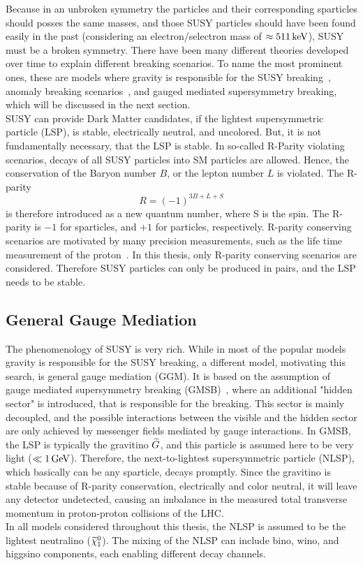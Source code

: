 Because in an unbroken symmetry the particles and their corresponding sparticles should posses the same masses, and those SUSY particles should have been found easily in the past (considering \eg an electron/selectron mass of $\approx511\,\text{ke\hspace{-.08em}V}$), SUSY must be a broken symmetry. There have been many different theories developed over time to explain different breaking scenarios. To name the most prominent ones, these are models where gravity is responsible for the SUSY breaking~\cite{SUSYPrimer}, anomaly breaking scenarios~\cite{AMSB}, and gauged mediated supersymmetry breaking, which will be discussed in the next section.\\
SUSY can provide Dark Matter candidates, if the lightest supersymmetric particle (LSP), is stable, electrically neutral, and uncolored. But, it is not fundamentally necessary, that the LSP is stable. In so-called R-Parity violating scenarios, decays of all SUSY particles into SM particles are allowed. Hence, the conservation of the Baryon number $B$, or the lepton number $L$ is violated. The R-parity
\begin{equation}
 R = (-1)^{3B+L+S}
\end{equation}
is therefore introduced as a new quantum number, where S is the spin. The R-parity is $-1$ for sparticles, and $+1$ for particles, respectively. R-parity conserving scenarios are motivated by many precision measurements, such as the life time measurement of the proton~\cite{ProtonDecay}.
In this thesis, only R-parity conserving scenarios are considered. Therefore SUSY particles can only be produced in pairs, and the LSP needs to be stable.\\



\subsection{General Gauge Mediation}\label{sec:GGM}
The phenomenology of SUSY is very rich. While in most of the popular models gravity is responsible for the SUSY breaking, a different model, motivating this search, is general gauge mediation (GGM). It is based on the assumption of gauge mediated supersymmetry breaking (GMSB)~\cite{GGM}, where an additional "hidden sector" is introduced, that is responsible for the breaking. This sector is mainly decoupled, and the possible interactions between the visible and the hidden sector are only achieved by messenger fields mediated by gauge interactions. In GMSB, the LSP is typically the gravitino $\widetilde{G}$, and this particle is assumed here to be very light ($\ll1\,\text{Ge\hspace{-.08em}V}$). Therefore, the next-to-lightest supersymmetric particle (NLSP), which basically can be any sparticle, decays promptly. Since the gravitino is stable because of R-parity conservation, electrically and color neutral, it will leave any detector undetected, causing an imbalance in the measured total transverse momentum in proton-proton collisions of the LHC.\\
In all models considered throughout this thesis, the NLSP is assumed to be the lightest neutralino ($\widetilde{\chi}^{0}_{1}$). The mixing of the NLSP can include bino, wino, and higgsino components, each enabling different decay channels.


